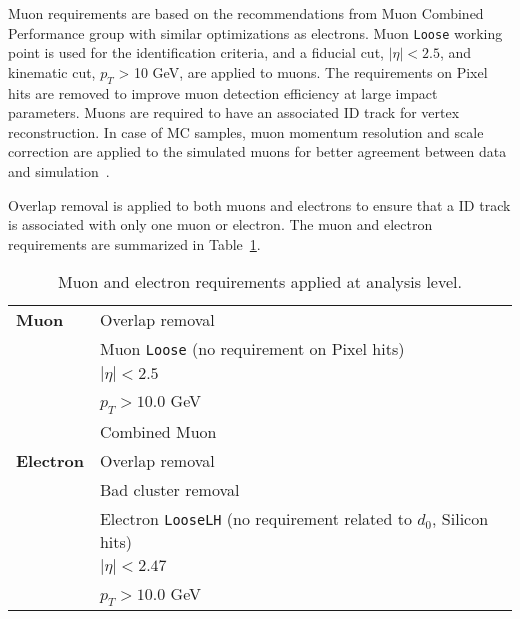 Muon requirements are based on the recommendations from Muon Combined Performance group with similar optimizations as electrons. Muon \texttt{Loose} working point is used for the identification criteria, and a fiducial cut, $|\eta| < 2.5$, and kinematic cut, $p_{T}$ > 10 GeV, are applied to muons. The requirements on Pixel hits are removed to improve muon detection efficiency at large impact parameters. Muons are required to have an associated ID track for vertex reconstruction. In case of MC samples, muon momentum resolution and scale correction are applied to the simulated muons for better agreement between data and simulation~\cite{Aad:2016jkr}.

Overlap removal is applied to both muons and electrons to ensure that a ID track is associated with only one muon or electron.%
The muon and electron requirements are summarized in Table~\ref{table:lepton_requirement}.

\begin{table}[!htb]
  \centering
  \begin{tabular}{ l  l }
    \hline
    \hline
    \textbf{Muon}     &       Overlap removal                                                                      \\
                                  &       Muon \texttt{Loose} (no requirement on Pixel hits)                       \\
                                  &       $|\eta| < 2.5$                                                           \\
                                  &       $p_{T} > 10.0$ GeV                                                       \\
                                  &       Combined Muon                                                            \\
    \hline
    \textbf{Electron} &       Overlap removal                                                                      \\
                                  &       Bad cluster removal                                                      \\
                                  &       Electron \texttt{LooseLH} (no requirement related to $d_{0}$, Silicon hits)\\
                                  &       $|\eta| < 2.47$                                                          \\
                                  &       $p_{T} > 10.0$ GeV                                                       \\
    \hline
    \hline
  \end{tabular}
  \caption{Muon and electron requirements applied at analysis level.}
  \label{table:lepton_requirement}
\end{table}







